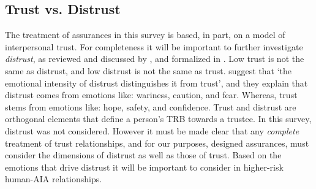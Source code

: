 \subsection{Trust vs. Distrust}
The treatment of assurances in this survey is based, in part, on a model of interpersonal trust. For completeness it will be important to further investigate \textit{distrust}, as reviewed and discussed by \citet{Lewicki1998-ox}, and formalized in \citet{McKnight2001-gz}. Low trust is not the same as distrust, and low distrust is not the same as trust. \citet{McKnight2001-gz} suggest that `the emotional intensity of distrust distinguishes it from trust', and they explain that distrust comes from emotions like: wariness, caution, and fear. Whereas, trust stems from emotions like: hope, safety, and confidence. Trust and distrust are orthogonal elements that define a person's TRB towards a trustee. In this survey, distrust was not considered. However it must be made clear that any \emph{complete} treatment of trust relationships, and for our purposes, designed assurances, must consider the dimensions of distrust as well as those of trust. Based on the emotions that drive distrust it will be important to consider in higher-risk human-AIA relationships.




